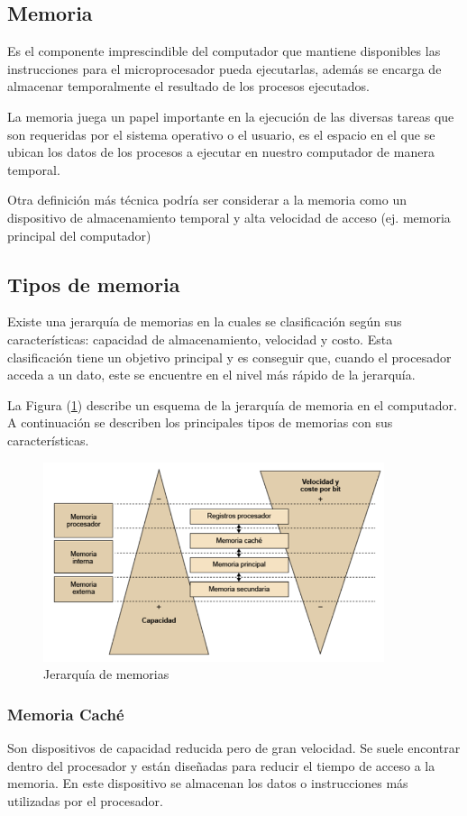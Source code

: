 \documentclass{article}
\begin{document}
\subsection{Memoria}
Es el componente imprescindible del computador que mantiene disponibles las instrucciones para el microprocesador pueda ejecutarlas, además se encarga de almacenar temporalmente el resultado de los procesos ejecutados.\cite{EcuRed}

La memoria juega un papel importante en la ejecución de las diversas tareas que son requeridas por el sistema operativo o el usuario, es el espacio en el que se ubican los datos de los procesos a ejecutar en nuestro computador de manera temporal.

Otra definición más técnica podría ser considerar a la memoria como un dispositivo de almacenamiento temporal y alta velocidad de acceso (ej. memoria principal del computador)\cite{Academia}

\subsection{Tipos de memoria}
Existe una jerarquía de memorias en la cuales se clasificación según sus características: capacidad de almacenamiento, velocidad y costo. Esta clasificación tiene un objetivo principal y es conseguir que, cuando el procesador acceda a un dato, este se encuentre en el nivel más rápido de la jerarquía.\cite{Estructura}

La Figura (\ref{fig:Jerarquia}) describe un esquema de la jerarquía de memoria en el computador.
A continuación se describen los principales tipos de memorias con sus características.

\begin{figure}[h]
\includegraphics[width=10cm]{Jerarquia.png}
\centering
\caption{Jerarquía de memorias}
\label{fig:Jerarquia}
\end{figure}

\subsubsection{Memoria Caché}
Son dispositivos de capacidad reducida pero de gran velocidad. Se suele encontrar dentro del procesador y están diseñadas para reducir el tiempo de acceso a la memoria. En este dispositivo se almacenan los datos o instrucciones más utilizadas por el procesador. \cite{Estructura}
\end{document}
